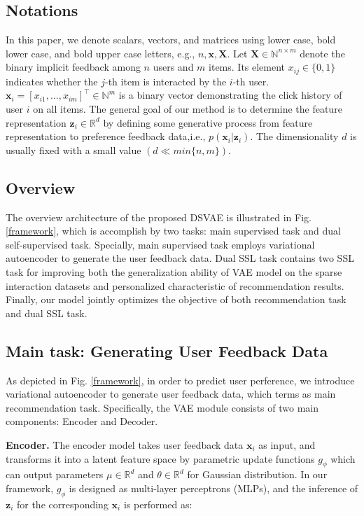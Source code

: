 \subsection{Notations}\label{subsec2}
In this paper, we denote scalars, vectors, and matrices using lower case, bold lower case, and bold upper case letters, e.g., $n,\mathbf{x}, \mathbf{X}$. Let $\mathbf{X}\in \mathbb{N}^{n\times m}$ denote the binary implicit feedback among $n$ users and $m$ items. Its element $x_{ij}\in \{0,1\}$ indicates whether the $j$-th item is interacted by the $i$-th user. $\mathbf{x}_i=[x_{i1}, ...,x_{im}]^\top\in\mathbb{N}^m $ is a binary vector demonstrating the click history of user $i$ on all items. The general goal of our method is to determine the feature representation $\mathbf{z}_i \in \mathbb{R}^d$ by defining some generative process from feature representation to preference feedback data,i.e., $p { \left( \mathbf{x}_i \lvert \mathbf{z}_i \right)}$. The dimensionality $d$ is usually fixed with a small value $\left(d \ll min\{n,m\}\right)$.

\subsection{Overview }\label{subsec2}
The overview architecture of the proposed DSVAE is illustrated in Fig. \ref{framework}, which is accomplish by two tasks: main supervised task and dual self-supervised task. Specially, main supervised task employs variational autoencoder to generate the user feedback data. Dual SSL task contains two SSL task for improving both the generalization ability of VAE model on the sparse interaction datasets and personalized characteristic of recommendation results. Finally, our model jointly optimizes the objective of both recommendation task and dual SSL task.

\subsection{Main task: Generating User Feedback Data }\label{33}
As depicted in Fig. \ref{framework}, in order to predict user perference, we introduce variational autoencoder to generate user feedback data, which terms as main recommendation task. Specifically, the VAE module consists of two main components: Encoder and Decoder.


\textbf{Encoder.} The encoder model takes user feedback data $\mathbf{x}_i$ as input, and transforms it into a latent feature space by parametric update functions $g_\phi$ which can output parameters $\mu \in \mathbb{R}^d $ and $\theta \in \mathbb{R}^d$ for Gaussian distribution. In our framework, $g_\phi$ is designed as multi-layer perceptrons (MLPs), and the inference of $\mathbf{z}_i$ for the corresponding $\mathbf{x}_i$ is performed as:

